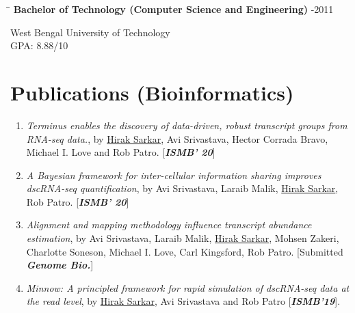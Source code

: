 \documentclass{res}
\begin{document}
\begin{resume}
\vspace{-0.1in}	
\begin{tabbing}
\hspace{2.3in}\= \hspace{2.6in}\= \kill %
{\bf Bachelor of Technology (Computer Science and Engineering)}  \>     -2011
\end{tabbing}  \vspace{-20pt}      %
West Bengal University of Technology     \\       
GPA: 8.88/10      \\   

\vspace{-0.2cm}
\section{Publications (Bioinformatics)}
\begin{enumerate}

\item {\it Terminus enables the discovery of data-driven, robust transcript groups from RNA-seq data.}, by \underline{Hirak Sarkar}, Avi Srivastava, Hector Corrada Bravo, Michael I. Love and Rob Patro. [\textit{\textbf{ISMB' 20}}]

\item {\it A Bayesian framework for inter-cellular information sharing improves dscRNA-seq quantification}, by Avi Srivastava, Laraib Malik, \underline{Hirak Sarkar}, Rob Patro. [\textit{\textbf{ISMB' 20}}]

\item {\it Alignment and mapping methodology influence transcript abundance estimation}, by Avi Srivastava, Laraib Malik, \underline{Hirak Sarkar}, Mohsen Zakeri, Charlotte Soneson, Michael I. Love, Carl Kingsford, Rob Patro. [Submitted  \textit{\textbf{Genome Bio.}}]

\item {\it Minnow: A principled framework for rapid simulation of dscRNA-seq data at the read level}, by \underline{Hirak Sarkar}, Avi Srivastava and Rob Patro [\textit{\textbf{ISMB'19}}]. 


\end{enumerate}
\end{resume}
\end{document}
